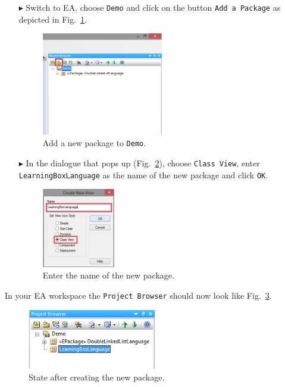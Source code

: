 \begin{enumerate}
\item[$\blacktriangleright$] Switch to EA, choose \texttt{Demo} and click on the button \texttt{Add a Package} as depicted in Fig.~\ref{fig:new_package}.

\begin{figure}[htbp]
	\centering
  \includegraphics[width=0.5\textwidth]{pics/memBoxBilder/memBox01.png}
	\caption{Add a new package to \texttt{Demo}.}
	\label{fig:new_package}
\end{figure}

\item[$\blacktriangleright$] In the dialogue that pops up (Fig.~\ref{fig:new_package_name}), choose \texttt{Class View}, enter \texttt{Learning\-Box\-Language} as the name of the new package and click \texttt{OK}.

\begin{figure}[htbp]
	\centering
    \includegraphics[width=0.3\textwidth]{pics/memBoxBilder/memBox02.png}
	\caption{Enter the name of the new package.}
	\label{fig:new_package_name}
\end{figure}
\end{enumerate}

In your EA workspace the \texttt{Project Browser} should now look like Fig.~\ref{fig:new_package_completed}.
\begin{figure}[htbp]
	\centering
  \includegraphics[width=0.5\textwidth]{pics/memBoxBilder/memBox03.png}
	\caption{State after creating the new package.}
	\label{fig:new_package_completed}
\end{figure}

